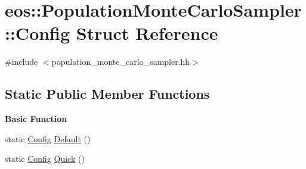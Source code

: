 \hypertarget{structeos_1_1PopulationMonteCarloSampler_1_1Config}{
\section{eos::PopulationMonteCarloSampler::Config Struct Reference}
\label{structeos_1_1PopulationMonteCarloSampler_1_1Config}
}


{\ttfamily \#include $<$population\_\-monte\_\-carlo\_\-sampler.hh$>$}\subsection*{Static Public Member Functions}
\begin{Indent}{\bf Basic Function}\par
{\em \label{_amgrp9ac0a05bc9f1ecee9a728c52951f9f43}
 }\begin{DoxyCompactItemize}
\item 
static \hyperlink{structeos_1_1PopulationMonteCarloSampler_1_1Config}{Config} \hyperlink{structeos_1_1PopulationMonteCarloSampler_1_1Config_a8f659cd4c289ebfea73765497eee01dd}{Default} ()
\item 
static \hyperlink{structeos_1_1PopulationMonteCarloSampler_1_1Config}{Config} \hyperlink{structeos_1_1PopulationMonteCarloSampler_1_1Config_aa88ccb299ca1bc2881951b82e6e66059}{Quick} ()
\end{DoxyCompactItemize}
\end{Indent}
